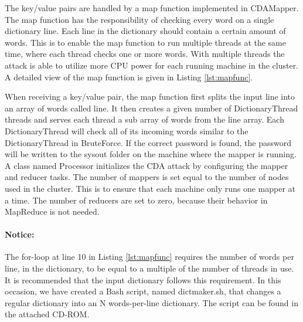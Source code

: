 \documentclass[pdftex,english,10pt,b5paper,twoside]{book}
\begin{document}
\noindent The key/value pairs are handled by a map function implemented in CDAMapper. The map function has the
responsibility of checking every word on a single dictionary line. Each line in
the dictionary should contain a certain amount of words. This is to enable the
map function to run multiple threads at the same time, where each thread checks
one or more words. With multiple threads the attack is able to utilize more CPU power
for each running machine in the cluster. A detailed view of the map function is
given in Listing \ref{lst:mapfunc}. 



When receiving a key/value pair, the map function first splits the input line
into an array of words called line. It then creates a given number of
DictionaryThread threads and serves each thread a sub array of words from the
line array. Each DictionaryThread will check all of its incoming words similar
to the DictionaryThread in BruteForce. If the correct password is found, the
password will be written to the sysout folder on the machine where the mapper is
running.\\

\noindent A class named Processor initializes the CDA attack by configuring the mapper and
reducer tasks. The number of mappers is set equal to the number of nodes
used in the cluster. This is to ensure that each machine only runs one mapper at
a time. The number of reducers are set to zero, because their behavior in
MapReduce is not needed.


\paragraph{Notice:} The for-loop at line 10 in Listing \ref{lst:mapfunc} requires the number of words
per line, in the dictionary, to be equal to a multiple of the number of threads in use. It is
recommended that the input dictionary follows this requirement. In this
occasion, we have created a Bash script, named dictmaker.sh, that changes a regular dictionary into
an N words-per-line dictionary. The script can be found in the attached CD-ROM.
 
\end{document}
